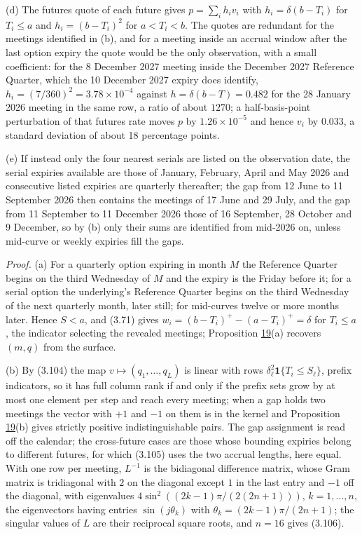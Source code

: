 \documentclass[11pt]{article}
\begin{document}
(d) The futures quote of each future gives \(p = \sum_i h_i v_i\) with \(h_i = \delta(b - T_i)\) for \(T_i \le a\) and \(h_i = (b - T_i)^2\) for \(a < T_i < b\). The quotes are redundant for the meetings identified in (b), and for a meeting inside an accrual window after the last option expiry the quote would be the only observation, with a small coefficient: for the 8 December 2027 meeting inside the December 2027 Reference Quarter, which the 10 December 2027 expiry does identify, \(h_i = (7/360)^2 = 3.78 \times 10^{-4}\) against \(h = \delta(b - T) = 0.482\) for the 28 January 2026 meeting in the same row, a ratio of about \(1270\); a half-basis-point perturbation of that futures rate moves \(p\) by \(1.26 \times 10^{-5}\) and hence \(v_i\) by \(0.033\), a standard deviation of about 18 percentage points.

(e) If instead only the four nearest serials are listed on the observation date, the serial expiries available are those of January, February, April and May 2026 and consecutive listed expiries are quarterly thereafter; the gap from 12 June to 11 September 2026 then contains the meetings of 17 June and 29 July, and the gap from 11 September to 11 December 2026 those of 16 September, 28 October and 9 December, so by (b) only their sums are identified from mid-2026 on, unless mid-curve or weekly expiries fill the gaps.

\emph{Proof.} (a) For a quarterly option expiring in month \(M\) the Reference Quarter begins on the third Wednesday of \(M\) and the expiry is the Friday before it; for a serial option the underlying's Reference Quarter begins on the third Wednesday of the next quarterly month, later still; for mid-curves twelve or more months later. Hence \(S < a\), and (3.71) gives \(w_i = (b - T_i)^+ - (a - T_i)^+ = \delta\) for \(T_i \le a\), the indicator selecting the revealed meetings; Proposition \hyperref[res:Proposition-19]{19}(a) recovers \((m, q)\) from the surface.

(b) By (3.104) the map \(v \mapsto (q_1, \dots, q_L)\) is linear with rows \(\delta_\ell^2 \mathbf 1\{T_i \le S_\ell\}\), prefix indicators, so it has full column rank if and only if the prefix sets grow by at most one element per step and reach every meeting; when a gap holds two meetings the vector with \(+1\) and \(-1\) on them is in the kernel and Proposition \hyperref[res:Proposition-19]{19}(b) gives strictly positive indistinguishable pairs. The gap assignment is read off the calendar; the cross-future cases are those whose bounding expiries belong to different futures, for which (3.105) uses the two accrual lengths, here equal. With one row per meeting, \(L^{-1}\) is the bidiagonal difference matrix, whose Gram matrix is tridiagonal with \(2\) on the diagonal except \(1\) in the last entry and \(-1\) off the diagonal, with eigenvalues \(4\sin^2((2k-1)\pi/(2(2n+1)))\), \(k = 1, \dots, n\), the eigenvectors having entries \(\sin(j\theta_k)\) with \(\theta_k = (2k-1)\pi/(2n+1)\); the singular values of \(L\) are their reciprocal square roots, and \(n = 16\) gives (3.106).
\end{document}
